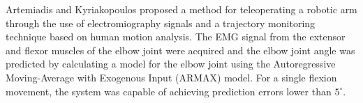 \documentclass[letterpaper, 10 pt, conference]{ieeeconf}  %
\begin{document}


Artemiadis and Kyriakopoulos \cite{Artemiadis1642196} proposed a method for teleoperating a robotic arm through the use of electromiography signals and a trajectory monitoring technique based on human motion analysis. The EMG signal from the extensor and flexor muscles of the elbow joint were acquired and the elbow joint angle was predicted by calculating a model for the elbow joint using the Autoregressive Moving-Average with Exogenous Input (ARMAX) model. 
For a single flexion movement, the system was capable of achieving prediction errors lower than \(5^{\circ}\).


\end{document}
